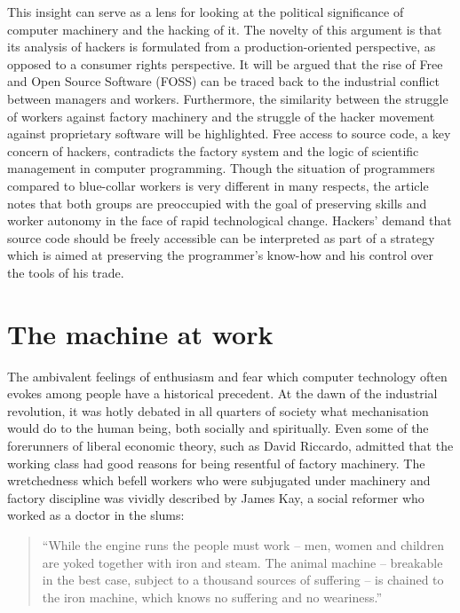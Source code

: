 This insight can serve as a lens for looking at the political
signif\hbox{}icance of computer machinery and the hacking of it. The novelty of
this argument is that its analysis of hackers is formulated from a
production-oriented perspective, as opposed to a consumer rights perspective. It
will be argued that the rise of Free and Open Source Software (FOSS) can be
traced back to the industrial conf\hbox{}lict between managers and workers.
Furthermore, the similarity between the struggle of workers against factory
machinery and the struggle of the hacker movement against proprietary software
will be highlighted. Free access to source code, a key concern of hackers,
contradicts the factory system and the logic of scientif\hbox{}ic management in
computer programming\cite{gnunited-hannemyr99}.  Though the situation of
programmers compared to blue-collar workers is very dif\hbox{}ferent in many
respects, the article notes that both groups are preoccupied with the goal of
preserving skills and worker autonomy in the face of rapid technological change.
Hackers' demand that source code should be freely accessible can be interpreted
as part of a strategy which is aimed at preserving the programmer's know-how and
his control over the tools of his trade. 


\section{The machine at work}
\label{s:hackers_gnunited-machine_at_work}

The ambivalent feelings of enthusiasm and fear which computer technology often
evokes among people have a historical precedent. At the dawn of the industrial
revolution, it was hotly debated in all quarters of society what mechanisation
would do to the human being, both socially and
spiritually\cite{gnunited-berg80}. Even some of the forerunners of liberal
economic theory, such as David Riccardo, admitted that the working class had
good reasons for being resentful of factory
machinery\cite{gnunited-riccardo1821}. The wretchedness which befell workers who
were subjugated under machinery and factory discipline was vividly described by
James Kay, a social reformer who worked as a doctor in the slums:

\begin{quote}
``While the engine runs the people must work – men, women and children are yoked
together with iron and steam. The animal machine – breakable in the best case,
subject to a thousand sources of suf\hbox{}fering – is chained to the iron
machine, which knows no suf\hbox{}fering and no
weariness.''\cite{gnunited-kay1832}
\end{quote}

